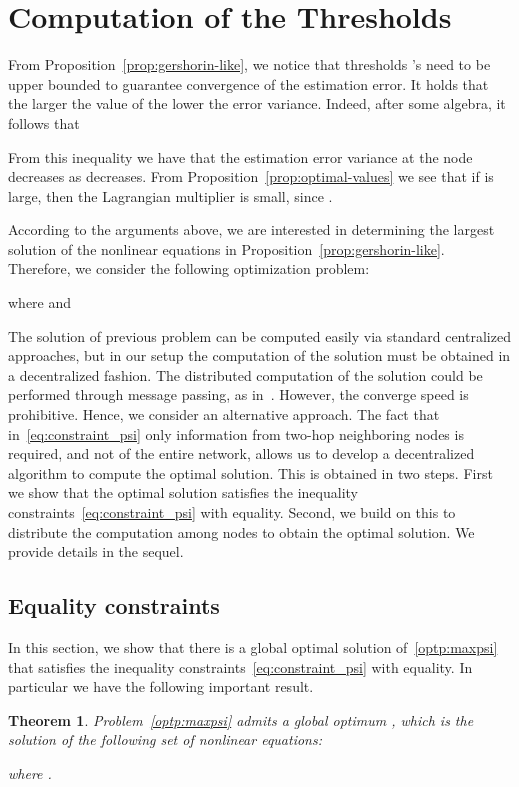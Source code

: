 \documentclass[a4paper,notitlepage,onecolumn]{article}
\newtheorem{theorem}{Theorem}[section]
\numberwithin{equation}{section}
\begin{document}
\section{Computation of the Thresholds}
\label{sec:computation_of_psi}

From Proposition~\ref{prop:gershorin-like}, we notice that
thresholds 's need to be upper bounded to guarantee
convergence of the estimation error. It holds that the larger the
value of  the lower the error variance. Indeed, after
some algebra, it follows that

From this inequality we have that the estimation error variance at
the node~ decreases as  decreases. From
Proposition~\ref{prop:optimal-values} we see that if  is
large, then the Lagrangian multiplier  is small, since
.

According to the arguments above, we are interested in determining
the largest solution of the nonlinear equations in
Proposition~\ref{prop:gershorin-like}. Therefore, we consider the
following optimization problem:

where  and

The solution of previous problem can be computed easily via
standard centralized approaches, but in our setup the computation
of the solution must be obtained in a decentralized fashion. The
distributed computation of the solution could be performed through
message passing, as in~\cite{JohannsonXiao06}. However, the
converge speed is prohibitive. Hence, we consider an alternative
approach. The fact that in~\eqref{eq:constraint_psi} only
information from two-hop neighboring nodes is required, and not of
the entire network, allows us to develop a decentralized algorithm
to compute the optimal solution. This is obtained in two steps.
First we show that the optimal solution satisfies the inequality
constraints~\eqref{eq:constraint_psi} with equality. Second, we build on this to distribute
the computation among nodes to obtain the optimal solution. We
provide details in the sequel.


\subsection{Equality constraints}

In this section, we show that there is a global optimal solution
of~\eqref{optp:maxpsi} that satisfies the inequality
constraints~\eqref{eq:constraint_psi} with equality. In particular
we have the following important result.

\begin{theorem} \label{theo:OP}
Problem~\eqref{optp:maxpsi} admits a global optimum , which is the solution of the following set of nonlinear equations:

where .
\end{theorem}
\end{document}
